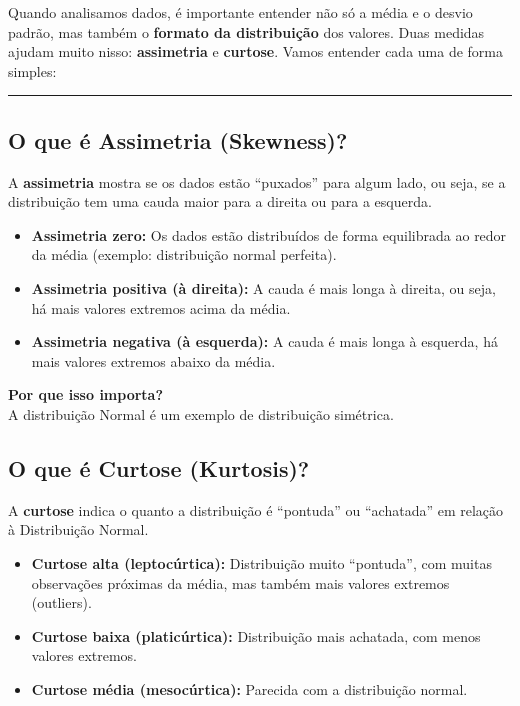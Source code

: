 \documentclass[
]{book}
\providecommand{\tightlist}{%
  \setlength{\itemsep}{0pt}\setlength{\parskip}{0pt}}
\begin{document}
Quando analisamos dados, é importante entender não só a média e o desvio padrão, mas também o \textbf{formato da distribuição} dos valores. Duas medidas ajudam muito nisso: \textbf{assimetria} e \textbf{curtose}. Vamos entender cada uma de forma simples:

\begin{center}\rule{0.5\linewidth}{0.5pt}\end{center}

\subsection{O que é Assimetria (Skewness)?}\label{o-que-uxe9-assimetria-skewness}

A \textbf{assimetria} mostra se os dados estão ``puxados'' para algum lado, ou seja, se a distribuição tem uma cauda maior para a direita ou para a esquerda.

\begin{itemize}
\tightlist
\item
  \textbf{Assimetria zero:} Os dados estão distribuídos de forma equilibrada ao redor da média (exemplo: distribuição normal perfeita).
\item
  \textbf{Assimetria positiva (à direita):} A cauda é mais longa à direita, ou seja, há mais valores extremos acima da média.
\item
  \textbf{Assimetria negativa (à esquerda):} A cauda é mais longa à esquerda, há mais valores extremos abaixo da média.
\end{itemize}

\textbf{Por que isso importa?}\\
A distribuição Normal é um exemplo de distribuição simétrica.

\subsection{O que é Curtose (Kurtosis)?}\label{o-que-uxe9-curtose-kurtosis}

A \textbf{curtose} indica o quanto a distribuição é ``pontuda'' ou ``achatada'' em relação à Distribuição Normal.

\begin{itemize}
\tightlist
\item
  \textbf{Curtose alta (leptocúrtica):} Distribuição muito ``pontuda'', com muitas observações próximas da média, mas também mais valores extremos (outliers).
\item
  \textbf{Curtose baixa (platicúrtica):} Distribuição mais achatada, com menos valores extremos.
\item
  \textbf{Curtose média (mesocúrtica):} Parecida com a distribuição normal.
\end{itemize}
\end{document}
